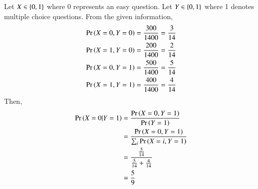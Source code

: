 Let $X \in \left\{0,1\right\}$ where 0 represents an easy question.  Let $Y \in \left\{0,1\right\}$ where 1 denotes multiple choice questions.
From the given information,
\begin{align}
\Pr\left(X=0,Y=0\right) &= \frac{300}{1400} = \frac{3}{14}
\\
\Pr\left(X=1,Y=0\right) &= \frac{200}{1400} = \frac{2}{14}
\\
\Pr\left(X=0,Y=1\right) &= \frac{500}{1400} = \frac{5}{14}
\\
\Pr\left(X=1,Y=1\right) &= \frac{400}{1400} = \frac{4}{14}
\end{align}
Then,
\begin{align}
\Pr\left(X=0|Y=1\right) &= \frac{\Pr\left(X=0,Y=1\right)}{\Pr\left(Y=1\right)}
\\
&= \frac{\Pr\left(X=0,Y=1\right)}{\sum_{i}\Pr\left(X=i,Y=1\right)}
\\
&=\frac{\frac{5}{14}}{\frac{5}{14}+\frac{4}{14}}
\\
&=\frac{5}{9}
\end{align}
